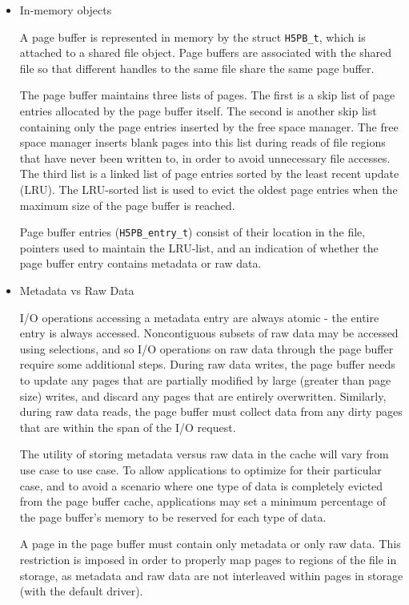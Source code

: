 \begin{itemize}

    \item In-memory objects

A page buffer is represented in memory by the struct \texttt{H5PB\_t}, which is attached to a shared file object. Page buffers are associated with the shared file so that different handles to the same file share the same page buffer.

The page buffer maintains three lists of pages. The first is a skip list of page entries allocated by the page buffer itself. The second is another skip list containing only the page entries inserted by the free space manager. The free space manager inserts blank pages into this list during reads of file regions that have never been written to, in order to avoid unnecessary file accesses. The third list is a linked list of page entries sorted by the least recent update (LRU). The LRU-sorted list is used to evict the oldest page entries when the maximum size of the page buffer is reached. 

Page buffer entries (\texttt{H5PB\_entry\_t}) consist of their location in the file, pointers used to maintain the LRU-list, and an indication of whether the page buffer entry contains metadata or raw data. 

    \item Metadata vs Raw Data

I/O operations accessing a metadata entry are always atomic - the entire entry is always accessed. Noncontiguous subsets of raw data may be accessed using selections, and so I/O operations on raw data through the page buffer require some additional steps. During raw data writes, the page buffer needs to update any pages that are partially modified by large (greater than page size) writes, and discard any pages that are entirely overwritten. Similarly, during raw data reads, the page buffer must collect data from any dirty pages that are within the span of the I/O request. 

The utility of storing metadata versus raw data in the cache will vary from use case to use case. To allow applications to optimize for their particular case, and to avoid a scenario where one type of data is completely evicted from the page buffer cache, applications may set a minimum percentage of the page buffer's memory to be reserved for each type of data.

A page in the page buffer must contain only metadata or only raw data. This restriction is imposed in order to properly map pages to regions of the file in storage, as metadata and raw data are not interleaved within pages in storage (with the default driver).


\end{itemize}
